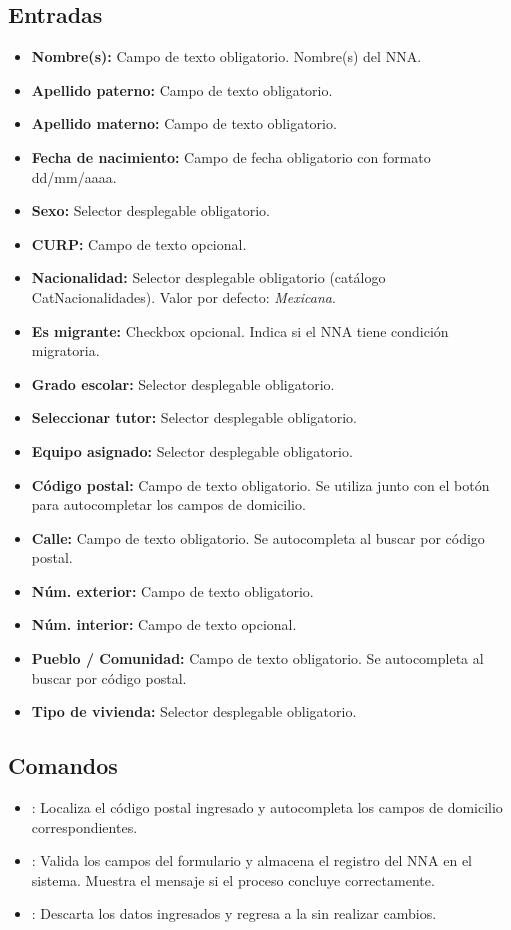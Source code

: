 \subsection{Entradas}
\begin{itemize}
	\item \textbf{Nombre(s):} Campo de texto obligatorio. Nombre(s) del NNA.
	\item \textbf{Apellido paterno:} Campo de texto obligatorio.
	\item \textbf{Apellido materno:} Campo de texto obligatorio.
	\item \textbf{Fecha de nacimiento:} Campo de fecha obligatorio con formato dd/mm/aaaa.
	\item \textbf{Sexo:} Selector desplegable obligatorio.
	\item \textbf{CURP:} Campo de texto opcional.
	\item \textbf{Nacionalidad:} Selector desplegable obligatorio (catálogo CatNacionalidades). Valor por defecto: \textit{Mexicana}.
	\item \textbf{Es migrante:} Checkbox opcional. Indica si el NNA tiene condición migratoria.
	\item \textbf{Grado escolar:} Selector desplegable obligatorio.
	\item \textbf{Seleccionar tutor:} Selector desplegable obligatorio.
	\item \textbf{Equipo asignado:} Selector desplegable obligatorio.
	\item \textbf{Código postal:} Campo de texto obligatorio. Se utiliza junto con el botón  para autocompletar los campos de domicilio.
	\item \textbf{Calle:} Campo de texto obligatorio. Se autocompleta al buscar por código postal.
	\item \textbf{Núm. exterior:} Campo de texto obligatorio.
	\item \textbf{Núm. interior:} Campo de texto opcional.
	\item \textbf{Pueblo / Comunidad:} Campo de texto obligatorio. Se autocompleta al buscar por código postal.
	\item \textbf{Tipo de vivienda:} Selector desplegable obligatorio.
\end{itemize}

\subsection{Comandos}
\begin{itemize}
	\item {}: Localiza el código postal ingresado y autocompleta los campos de domicilio correspondientes.
	\item {}: Valida los campos del formulario y almacena el registro del NNA en el sistema. Muestra el mensaje  si el proceso concluye correctamente.
	\item {}: Descarta los datos ingresados y regresa a la  sin realizar cambios.
\end{itemize}





